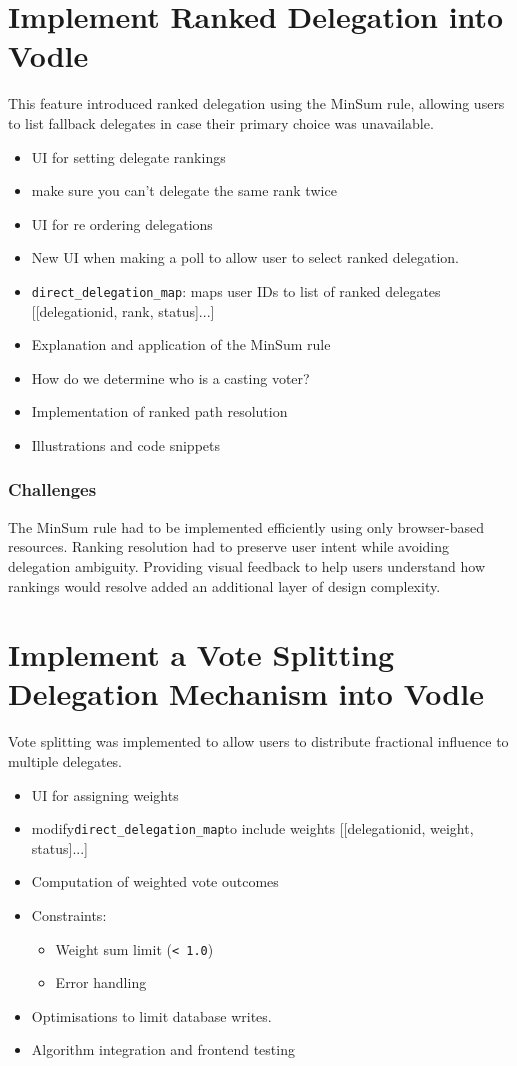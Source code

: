 \section{Implement Ranked Delegation into Vodle}\label{sec:design_ranked_delegation}
This feature introduced ranked delegation using the MinSum rule, allowing users to list fallback delegates in case their primary choice was unavailable.

\begin{itemize}
  \item UI for setting delegate rankings
  \item make sure you can't delegate the same rank twice
  \item UI for re ordering delegations
  \item New UI when making a poll to allow user to select ranked delegation.
  \item \verb|direct_delegation_map|: maps user IDs to list of ranked delegates [[delegationid, rank, status]...]
  \item Explanation and application of the MinSum rule
  \item How do we determine who is a casting voter?
  \item Implementation of ranked path resolution
  \item Illustrations and code snippets
\end{itemize}

\subsubsection{Challenges}
The MinSum rule had to be implemented efficiently using only browser-based resources. Ranking resolution had to preserve user intent while avoiding delegation ambiguity. Providing visual feedback to help users understand how rankings would resolve added an additional layer of design complexity.

\section{Implement a Vote Splitting Delegation Mechanism into Vodle}
Vote splitting was implemented to allow users to distribute fractional influence to multiple delegates.

\begin{itemize}
  \item UI for assigning weights
  \item modify\verb|direct_delegation_map|to include weights [[delegationid, weight, status]...]
  \item Computation of weighted vote outcomes
  \item Constraints:
  \begin{itemize}
    \item Weight sum limit (\texttt{< 1.0})
    \item Error handling
  \end{itemize}
  \item Optimisations to limit database writes.
  \item Algorithm integration and frontend testing
\end{itemize}

